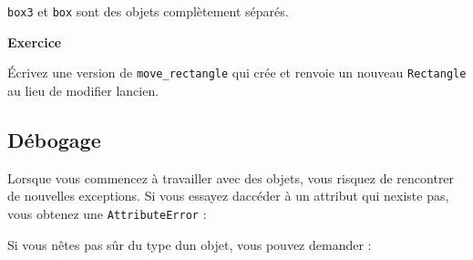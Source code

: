 \begin{Shaded}
\begin{Highlighting}[]
\OperatorTok{\textgreater{}\textgreater{}\textgreater{}}\OperatorTok{=}
\OperatorTok{\textgreater{}\textgreater{}\textgreater{}}
\OperatorTok{\textgreater{}\textgreater{}\textgreater{}}
\end{Highlighting}
\end{Shaded}

\texttt{box3} et \texttt{box} sont des objets complètement séparés.

\textbf{Exercice}

Écrivez une version de \texttt{move\_rectangle} qui crée et renvoie un
nouveau \texttt{Rectangle} au lieu de modifier l\textquotesingle ancien.

\hypertarget{duxe9bogage}{%
\subsection{Débogage}\label{duxe9bogage}}

Lorsque vous commencez à travailler avec des objets, vous risquez de
rencontrer de nouvelles exceptions. Si vous essayez
d\textquotesingle accéder à un attribut qui n\textquotesingle existe
pas, vous obtenez une \texttt{AttributeError} :

\begin{Shaded}
\begin{Highlighting}[]
\OperatorTok{\textgreater{}\textgreater{}\textgreater{}}\OperatorTok{=}
\OperatorTok{\textgreater{}\textgreater{}\textgreater{}} 
\end{Highlighting}
\end{Shaded}

Si vous n\textquotesingle êtes pas sûr du type d\textquotesingle un
objet, vous pouvez demander :

\begin{Shaded}
\begin{Highlighting}[]
\OperatorTok{\textgreater{}\textgreater{}\textgreater{}} 
\OperatorTok{\textless{}} \OperatorTok{\textgreater{}}
\end{Highlighting}
\end{Shaded}

